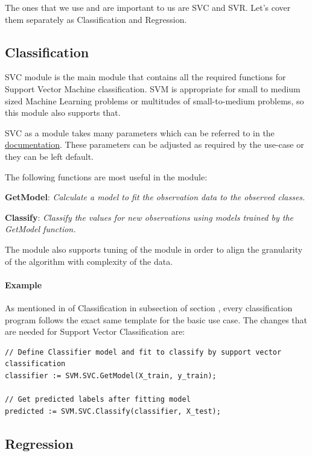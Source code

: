 \documentclass[a4paper,oneside,12pt]{book}
\begin{document}
The ones that we use and are important to us are SVC and SVR. Let's cover them separately as Classification and Regression.

\subsection{Classification}

SVC module is the main module that contains all the required functions for Support Vector Machine classification. SVM is appropriate for small to medium sized Machine Learning problems or multitudes of small-to-medium problems, so this module also supports that. 

SVC as a module takes many parameters which can be referred to in the \href{https://cdn.hpccsystems.com/pdf/ml/SupportVectorMachines.pdf}{documentation}. These parameters can be adjusted as required by the use-case or they can be left default. 

The following functions are most useful in the module:

\textbf{GetModel}: \textit{Calculate a model to fit the observation data to the observed classes.}

\textbf{Classify}: \textit{Classify the values for new observations using models trained by the GetModel function.}

The module also supports tuning of the module in order to align the granularity of the algorithm with complexity of the data.

\paragraph{Example}

As mentioned in  of Classification in  subsection of section , every classification program follows the exact same template for the basic use case. The changes that are needed for Support Vector Classification are:

\begin{lstlisting}
// Define Classifier model and fit to classify by support vector classification
classifier := SVM.SVC.GetModel(X_train, y_train);

// Get predicted labels after fitting model
predicted := SVM.SVC.Classify(classifier, X_test);
\end{lstlisting}

\subsection{Regression}
\end{document}
